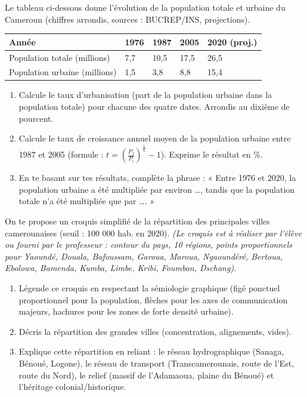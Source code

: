\documentclass[11pt]{article}
\newcounter{popsec}
\newcounter{popsub}
\newcommand{\courssub}[1]{%
  \stepcounter{popsub}%
  \par\vspace{9pt}\noindent{\popxbold\fontsize{11.5}{13}\selectfont\color{popink}{\color{poporange}\thepopsec.\thepopsub}\hspace{6pt}#1}\par\nopagebreak\vspace{4pt}
}
\begin{document}
\begin{exercice}
Le tableau ci-dessous donne l'évolution de la population totale et urbaine du Cameroun (chiffres arrondis, sources : BUCREP/INS, projections).

\begin{center}
\begin{tabularx}{\linewidth}{|l|X|X|X|X|}\hline
\textbf{Année} & \textbf{1976} & \textbf{1987} & \textbf{2005} & \textbf{2020 (proj.)} \\ \hline
Population totale (millions) & 7,7 & 10,5 & 17,5 & 26,5 \\ \hline
Population urbaine (millions) & 1,5 & 3,8 & 8,8 & 15,4 \\ \hline
\end{tabularx}
\end{center}

\begin{enumerate}
    \item Calcule le taux d'urbanisation (part de la population urbaine dans la population totale) pour chacune des quatre dates. Arrondis au dixième de pourcent.
    \item Calcule le taux de croissance annuel moyen de la population urbaine entre 1987 et 2005 (formule : $t = \left( \frac{P_f}{P_i} \right)^{\frac{1}{n}} - 1$). Exprime le résultat en \%.
    \item En te basant sur tes résultats, complète la phrase : « Entre 1976 et 2020, la population urbaine a été multipliée par environ \ldots , tandis que la population totale n'a été multipliée que par \ldots . »
\end{enumerate}
\end{exercice}

\courssub{Je m'entraîne}

\begin{exercice}
On te propose un croquis simplifié de la répartition des principales villes camerounaises (seuil : 100 000 hab. en 2020). \emph{(Le croquis est à réaliser par l'élève ou fourni par le professeur : contour du pays, 10 régions, points proportionnels pour Yaoundé, Douala, Bafoussam, Garoua, Maroua, Ngaoundéré, Bertoua, Ebolowa, Bamenda, Kumba, Limbe, Kribi, Foumban, Dschang).}

\begin{enumerate}
    \item Légende ce croquis en respectant la sémiologie graphique (figé ponctuel proportionnel pour la population, flèches pour les axes de communication majeurs, hachures pour les zones de forte densité urbaine).
    \item Décris la répartition des grandes villes (concentration, alignements, vides).
    \item Explique cette répartition en reliant : le réseau hydrographique (Sanaga, Bénoué, Logone), le réseau de transport (Transcamerounais, route de l'Est, route du Nord), le relief (massif de l'Adamaoua, plaine du Bénoué) et l'héritage colonial/historique.
\end{enumerate}
\end{exercice}
\end{document}
